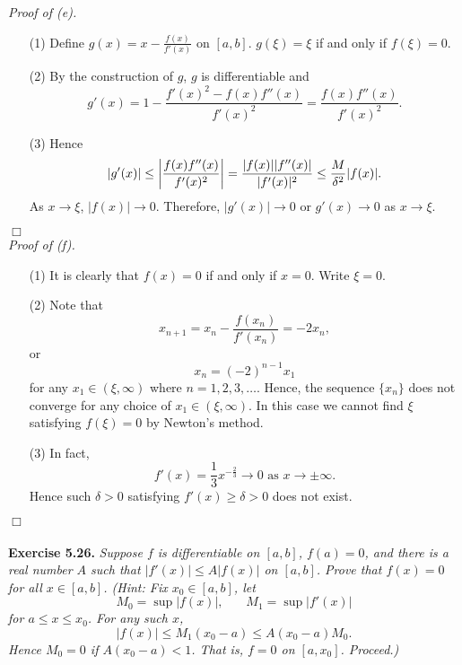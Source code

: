 \documentclass{article}
\begin{document}
\emph{Proof of (e).}
\begin{enumerate}
\item[(1)]
Define $g(x) = x - \frac{f(x)}{f'(x)}$ on $[a,b]$.
$g(\xi) = \xi$ if and only if $f(\xi) = 0$.

\item[(2)]
By the construction of $g$, $g$ is differentiable and
\[
  g'(x)
  = 1 - \frac{f'(x)^2 - f(x) f''(x)}{f'(x)^2}
  = \frac{f(x) f''(x)}{f'(x)^2}.
\]

\item[(3)]
Hence
\[
  |g'(x)|
  \leq \abs{\frac{f(x) f''(x)}{f'(x)^2}}
  = \frac{|f(x)| |f''(x)|}{|f'(x)|^2}
  \leq \frac{M}{\delta^2} |f(x)|.
\]
As $x \to \xi$, $|f(x)| \to 0$.
Therefore,
$|g'(x)| \to 0$ or $g'(x) \to 0$ as $x \to \xi$.
\end{enumerate}
$\Box$ \\



\emph{Proof of (f).}
\begin{enumerate}
\item[(1)]
It is clearly that $f(x) = 0$ if and only if $x = 0$.
Write $\xi = 0$.

\item[(2)]
Note that
\[
  x_{n+1} = x_n - \frac{f(x_n)}{f'(x_n)} = -2 x_n,
\]
or
\[
  x_n = (-2)^{n-1} x_1
\]
for any $x_1 \in (\xi, \infty)$ where $n = 1, 2, 3, \ldots$.
Hence, the sequence $\{x_n\}$ does not converge for any choice of $x_1 \in (\xi, \infty)$.
In this case we cannot find $\xi$ satisfying $f(\xi) = 0$ by Newton's method.

\item[(3)]
In fact,
\[
  f'(x) = \frac{1}{3} x^{-\frac{2}{3}} \to 0 \text{ as } x \to \pm \infty.
\]
Hence such $\delta > 0$ satisfying $f'(x) \geq \delta > 0$ does not exist.
\end{enumerate}
$\Box$ \\\\






\textbf{Exercise 5.26.}
\emph{Suppose $f$ is differentiable on $[a,b]$, $f(a) = 0$,
and there is a real number $A$ such that $|f'(x)| \leq A|f(x)|$ on $[a,b]$.
Prove that $f(x)=0$ for all $x \in [a,b]$.
(Hint: Fix $x_0 \in [a,b]$, let
\[
  M_0 = \sup{|f(x)|}, \:\:\:\:\:\:\:\: M_1 = \sup{|f'(x)|}
\]
for $a \leq x \leq x_0$.
For any such $x$,
\[
  |f(x)| \leq M_1(x_0-a) \leq A(x_0-a) M_0.
\]
Hence $M_0 = 0$ if $A(x_0-a) < 1$.
That is, $f = 0$ on $[a,x_0]$.
Proceed.)} \\
\end{document}

